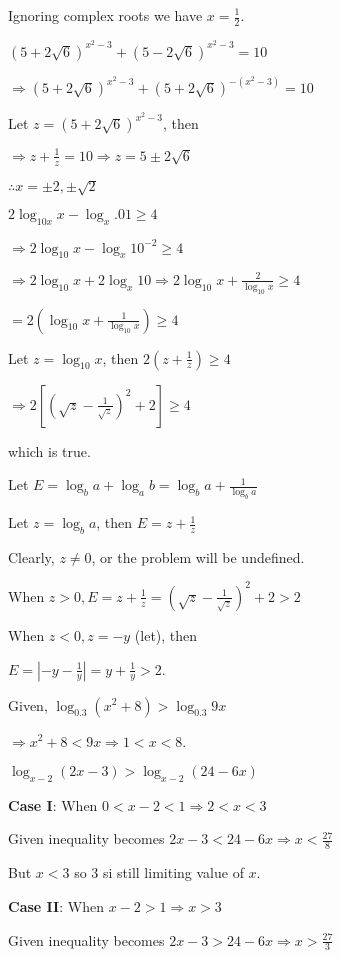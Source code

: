   Ignoring complex roots we have $x = \frac{1}{2}$.
\item $(5 + 2\sqrt{6})^{x^2 - 3} + (5 - 2\sqrt{6})^{x^2 - 3} = 10$

  $\Rightarrow (5 + 2\sqrt{6})^{x^2 - 3} + (5 + 2\sqrt{6})^{-(x^2 - 3)} = 10$

  Let $z = (5 + 2\sqrt{6})^{x^2 - 3}$, then

  $\Rightarrow z + \frac{1}{z} = 10 \Rightarrow z = 5\pm2\sqrt{6}$

  $\therefore x = \pm2, \pm\sqrt{2}$
\item $2\log_{10x}x - \log_x{.01}\geq 4$

  $\Rightarrow 2\log_{10}x - \log_x10^{-2} \geq 4$

  $\Rightarrow 2\log_{10}x + 2\log_x10 \Rightarrow 2\log_{10}x + \frac{2}{\log_{10}x}\geq 4$

  $= 2\left(\log_{10}x + \frac{1}{\log_{10}x}\right)\geq 4$

  Let $z = \log_{10}x$, then $2\left(z + \frac{1}{z}\right) \geq 4$

  $\Rightarrow 2\left[\left(\sqrt{z} - \frac{1}{\sqrt{z}}\right)^2 + 2\right]\geq 4$

  which is true.
\item Let $E = \log_b a + \log_ab = \log_ba + \frac{1}{\log_ba}$

  Let $z = \log_ba$, then $E = z + \frac{1}{z}$

  Clearly, $z\neq 0$, or the problem will be undefined.

  When $z > 0, E = z + \frac{1}{z} = \left(\sqrt{z} - \frac{1}{\sqrt{z}}\right)^2 + 2 > 2$

  When $z < 0, z = -y$ (let), then

  $E = \left|- y - \frac{1}{y}\right| = y + \frac{1}{y} > 2$.
\item Given, $\log_{0.3}(x^2 + 8) > \log_{0.3}9x$

  $\Rightarrow x^2 + 8 < 9x \Rightarrow 1 < x < 8$.
\item $\log_{x - 2}(2x - 3) > \log_{x - 2}(24 - 6x)$

  {\bf Case I}: When $0 < x - 2 < 1 \Rightarrow 2 < x < 3$

  Given inequality becomes $2x - 3 < 24 - 6x \Rightarrow x < \frac{27}{8}$

  But $x < 3$ so $3$ si still limiting value of $x$.

  {\bf Case II}: When $x - 2 > 1 \Rightarrow x > 3$

  Given inequality becomes $2x - 3 > 24 - 6x \Rightarrow x > \frac{27}{3}$

